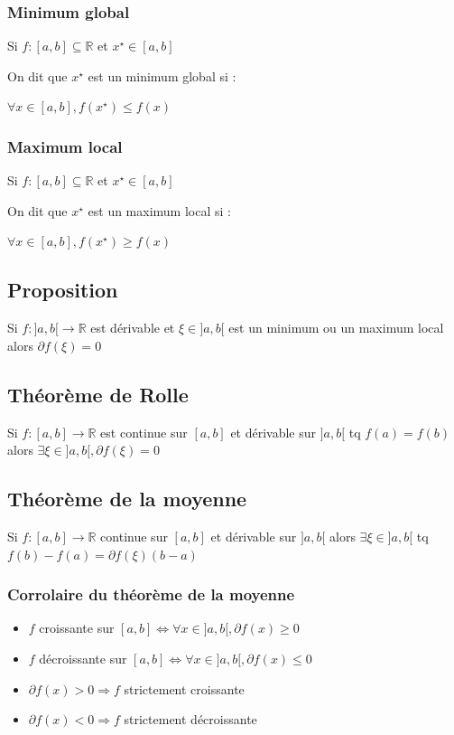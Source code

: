 \documentclass[a4paper,10pt]{article}
\newcommand{\ap}{\rightarrow}
\newcommand{\R}{\mathbb{R}}
\newcommand{\so}{\Rightarrow}
\newcommand{\ioi}{\Leftrightarrow}
\begin{document}
\subsubsection{Minimum global}

Si $f: [ a, b ] \subseteq \R$ et $x^\star \in [a,b]$

On dit que $x^\star$ est un minimum global si :

$\forall x \in [a,b], f(x^\star) \leq f(x)$

\subsubsection{Maximum local}

Si $f: [ a, b ] \subseteq \R$ et $x^\star \in [a,b]$

On dit que $x^\star$ est un maximum local si :

$\forall x \in [a,b], f(x^\star) \geq f(x)$

\subsection{Proposition}

Si $f: ]a,b[ \ap \R$ est dérivable et $\xi \in ]a,b[$ est un minimum ou un maximum local alors $\partial f(\xi) = 0$

\subsection{Théorème de Rolle}

Si $f : [a,b] \ap \R$ est continue sur $[a,b]$ et dérivable sur $]a,b[$ tq $f(a) = f(b)$ alors $\exists \xi \in ]a,b[, \partial f(\xi) = 0$

\subsection{Théorème de la moyenne}

Si $f: [a,b] \ap \R$ continue sur $[a,b]$ et dérivable sur $]a,b[$ alors $\exists \xi \in ]a,b[$ tq $f(b) - f(a) = \partial f(\xi) (b-a)$

\subsubsection{Corrolaire du théorème de la moyenne}

\begin{itemize}
	\item{$f$ croissante sur $[a,b] \ioi \forall x \in ]a,b[, \partial f(x) \geq 0$}
         \item{$f$ décroissante sur $[a,b] \ioi \forall x \in ]a,b[, \partial f(x) \leq 0$}
         \item{$\partial f(x) > 0 \so f$ strictement croissante}
         \item{$\partial f(x) < 0 \so f$ strictement décroissante}
\end{itemize}
\end{document}

